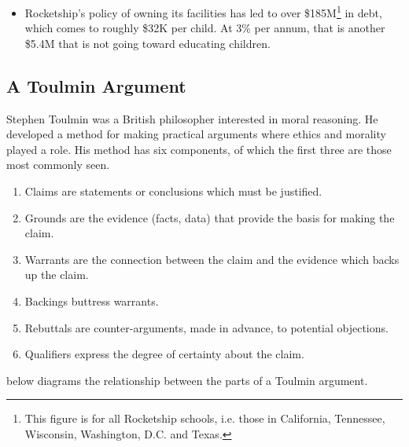 \begin{enumerate}[topsep=0.3\baselineskip,itemsep=0.25\baselineskip]
\begin{itemize}[topsep=0.125\baselineskip,itemsep=0.25\baselineskip]
      \item Rocketship's policy of owning its facilities has led to over \$185M\footnote{This figure is for all Rocketship schools, i.e. those in  California, Tennessee, Wisconsin, Washington, D.C. and Texas.} in debt, which comes to roughly \$32K per child. At 3\% per annum, that is another \$5.4M that is not going toward educating children.
    \end{itemize}
\end{enumerate}

\subsection{A Toulmin Argument}%
\label{sec:toulmin-arguments}\indent%

Stephen Toulmin was a British philosopher interested in moral reasoning. He developed a method for making practical arguments where ethics and morality played a role. His method has six components, of which the first three are those most commonly seen.
\begin{enumerate}[topsep=0.3\baselineskip,itemsep=0.25\baselineskip]
  \item Claims are statements or conclusions which must be justified.
  \item Grounds are the evidence (facts, data) that provide the basis for making the claim.
  \item Warrants are the connection between the claim and the evidence which backs up the claim.
  \item Backings buttress warrants.
  \item Rebuttals are counter-arguments, made in advance, to potential objections.
  \item Qualifiers express the degree of certainty about the claim.
\end{enumerate}

 below diagrams the relationship between the parts of a Toulmin argument.

